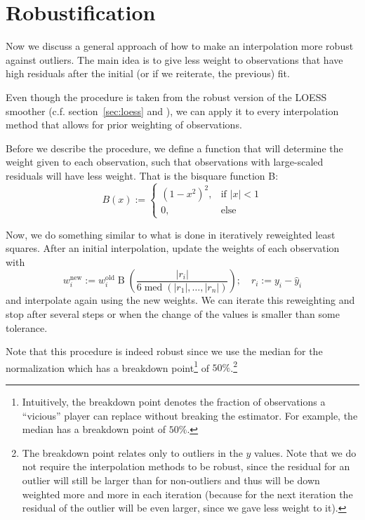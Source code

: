 \section{Robustification}{
	\label{sec:loess_robustify}
	{ %
		Now we discuss a general approach of how to make an interpolation more robust against outliers. The main idea is to give less weight to observations that have high residuals after the initial (or if we reiterate, the previous) fit.

		Even though the procedure is taken from the robust version of the LOESS smoother (c.f. section~\ref{sec:loess} and \cite{clevelandRobustLocallyWeighted1979}), we can apply it to every interpolation method that allows for prior weighting of observations.
	}
	
	{	
		Before we describe the procedure, we define a function that will determine the weight given to each observation, such that observations with large-scaled residuals will have less weight. That is the bisquare function B:
		$$
			B(x):=\begin{cases}
				\left(1-x^{2}\right)^{2}, & \text{if } |x|<1 \\
				0,                        & \text{else }
			\end{cases}
		$$

		Now, we do something similar to what is done in iteratively reweighted least squares. After an initial interpolation, update the weights of each observation with
		\begin{equation}
			w_i^\text{new}:=w_i^\text{old} \operatorname{B}\left(\frac{|r_i|}{6\operatorname{med}\left(|r_1|,\dots,|r_n|\right)}\right);\quad
			r_i := y_i - \hat y_i
			\label{eq:bisquare}
		\end{equation}
		and interpolate again using the new weights. We can iterate this reweighting and stop after several steps or when the change of the values is smaller than some tolerance.
	}

	Note that this procedure is indeed robust since we use the median for the normalization which has a breakdown point\footnote{Intuitively, the breakdown point denotes the fraction of observations a ``vicious'' player can replace without breaking the estimator. For example, the median has a breakdown point of $50 \%$.} of $50 \%$.\footnote{The breakdown point relates only to outliers in the $y$ values. Note that we do not require the interpolation methods to be robust, since the residual for an outlier will  still be larger than for non-outliers and thus will be down weighted more and more in each iteration (because for the next iteration the residual of the outlier will be even larger, since we gave less weight to it).}
}
